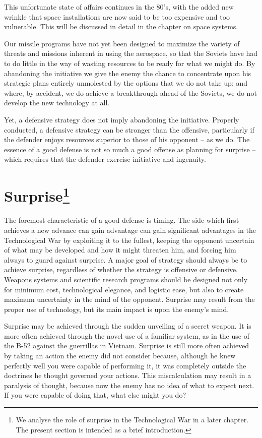 This unfortunate state of affairs continues in the 80's, with the added new wrinkle that space installations are now said to be too expensive and too vulnerable. This will be discussed in detail in the chapter on space systems.

Our missile programs have not yet been designed to maximize the variety of threats and missions inherent in using the aerospace, so that the Soviets have had to do little in the way of wasting resources to be ready for what we might do. By abandoning the initiative we give the enemy the chance to concentrate upon his strategic plans entirely unmolested by the options that we do not take up; and where, by accident, we do achieve a breakthrough ahead of the Soviets, we do not develop the new technology at all.

Yet, a defensive strategy does not imply abandoning the initiative. Properly conducted, a defensive strategy can be stronger than the offensive, particularly if the defender enjoys resources superior to those of his opponent -- as we do. The essence of a good defense is not so much a good offense as planning for surprise -- which requires that the defender exercise initiative and ingenuity.

\section{Surprise\footnote{
   We analyse the role of surprise in the Technological War in a later chapter. The present section is intended as a brief introduction.}
}

The foremost characteristic of a good defense is timing. The side which first achieves a new advance can gain advantage can gain significant advantages in the Technological War by exploiting it to the fullest, keeping the opponent uncertain of what may be developed and how it might threaten him, and forcing him always to guard against surprise. A major goal of strategy should always be to achieve surprise, regardless of whether the strategy is offensive or defensive. Weapons systems and scientific research programs should be designed not only for minimum cost, technological elegance, and logistic ease, but also to create maximum uncertainty in the mind of the opponent. Surprise may result from the proper use of technology, but its main impact is upon the enemy's mind.

Surprise may be achieved through the sudden unveiling of a secret weapon. It is more often achieved through the novel use of a familiar system, as in the use of the B-52 against the guerrillas in Vietnam. Surprise is still more often achieved by taking an action the enemy did not consider because, although he knew perfectly well you were capable of performing it, it was completely outside the doctrines he thought governed your actions. This miscalculation may result in a paralysis of thought, because now the enemy has no idea of what to expect next. If you were capable of doing that, what else might you do?

